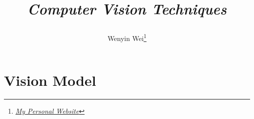 \documentclass[10pt]{article}
\title{\begin{center}{\Huge \textit{Computer Vision Techniques}}\end{center}}
\author{Wenyin Wei\footnote{\href{https://wenyin.xyz/}{\textit{My Personal Website}}}}
\affiliation{
Tsinghua University\\
Department of Engineering Physics
}
\begin{document}
	\maketitle
	\flushbottom
	\newpage
	\pagestyle{fancynotes}

	\part{Vision Model}
	
\end{document}
